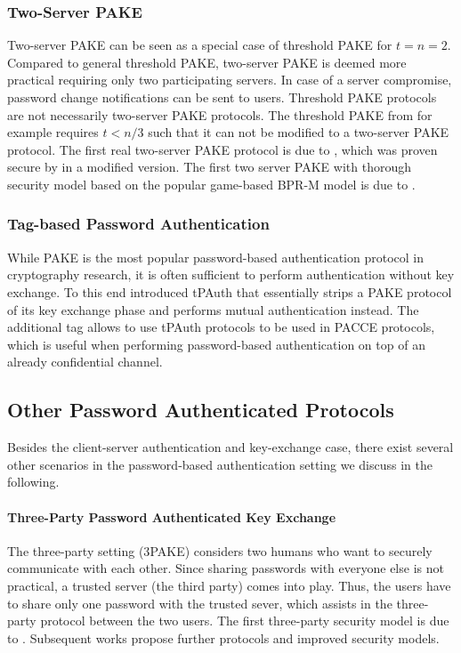 \subsubsection{Two-Server PAKE}
Two-server \ac{PAKE} can be seen as a special case of threshold PAKE for $t=n=2$.
Compared to  general threshold \ac{PAKE}, two-server \ac{PAKE} is deemed more practical requiring only two participating servers.
In case of a server compromise, password change notifications can be sent to users.
Threshold \ac{PAKE} protocols are not necessarily two-server \ac{PAKE} protocols.
The threshold \ac{PAKE} from \citet{RaimondoG03} for example requires $t<n/3$ such that it can not be modified to a two-server \ac{PAKE} protocol.
The first real two-server PAKE protocol is due to \citet{BrainardJKS03}, which was proven secure by \citet{SzydloK05} in a modified version.
The first two server PAKE with thorough security model based on the popular game-based \ac{BPR-M} model \cite{Bellare2000} is due to \citet{Katz2012a}.

\subsubsection{Tag-based Password Authentication}
While \ac{PAKE} is the most popular password-based authentication protocol in cryptography research, it is often sufficient to perform authentication without key exchange.
To this end \citet{Manulis2014} introduced \ac{tPAuth} that essentially strips a \ac{PAKE} protocol of its key exchange phase and performs mutual authentication instead.
The additional tag allows to use \ac{tPAuth} protocols to be used in \ac{PACCE} protocols, which is useful when performing password-based authentication on top of an already confidential channel.

\subsection{Other Password Authenticated Protocols} \label{sec:other-pake}
Besides the client-server authentication and key-exchange case, there exist several other scenarios in the password-based authentication setting we discuss in the following.

\paragraph{Three-Party Password Authenticated Key Exchange}
The three-party setting (3\ac{PAKE}) considers two humans who want to securely communicate with each other.
Since sharing passwords with everyone else is not practical, a trusted server (the third party) comes into play.
Thus, the users have to share only one password with the trusted sever, which assists in the three-party protocol between the two users.
The first three-party security model is due to \citet{Abdalla2005}.
Subsequent works \cite{CliffTB06,Yoneyama08,TsaiC13} propose further protocols and improved security models.

